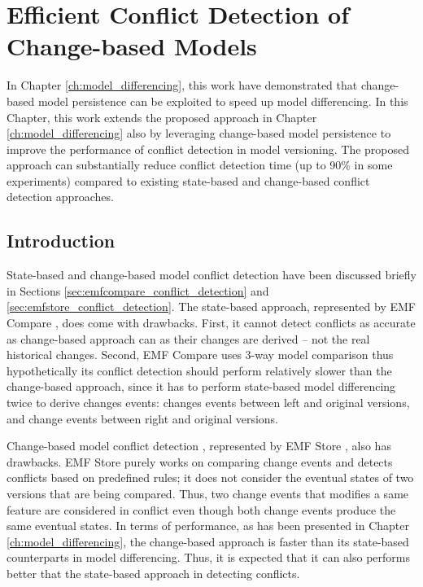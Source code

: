 \chapter{Efficient Conflict Detection of Change-based Models}
\label{ch:conflict_detection}
  
In Chapter \ref{ch:model_differencing}, this work have demonstrated that  change-based model persistence can be exploited to speed up model differencing. In this Chapter, this work extends the proposed approach in Chapter \ref{ch:model_differencing} also by leveraging change-based model persistence to improve the performance of conflict detection in model versioning. The proposed approach can substantially reduce conflict detection time (up to 90\% in some experiments) compared to existing state-based and change-based conflict detection approaches. 

\section{Introduction}
\label{sec:introduction_7}
State-based and change-based model conflict detection have been discussed briefly in Sections \ref{sec:emfcompare_conflict_detection} and \ref{sec:emfstore_conflict_detection}. The state-based approach, represented by EMF Compare \cite{emfcompare2018developer}, does come with drawbacks. First, it cannot detect conflicts as accurate as change-based approach can as their changes are derived -- not the real historical changes. Second, EMF Compare uses 3-way model comparison \cite{emfcompare2018developer} thus hypothetically its conflict detection should perform relatively slower than the change-based approach, since it has to perform state-based model differencing twice to derive changes events: changes events between left and original versions, and change events between right and original versions. 

Change-based model conflict detection \cite{koegel2010operation}, represented by EMF Store \cite{emfstore2019what}, also has drawbacks. EMF Store purely works on comparing change events and detects conflicts based on predefined rules; it does not consider the eventual states of two versions that are being compared. Thus, two change events that modifies a same feature are considered in conflict even though both change events produce the same eventual states. In terms of performance, as has been presented in Chapter \ref{ch:model_differencing}, the change-based approach is faster than its state-based counterparts in model differencing. Thus, it is expected that it can also performs better that the state-based approach in detecting conflicts.
 
